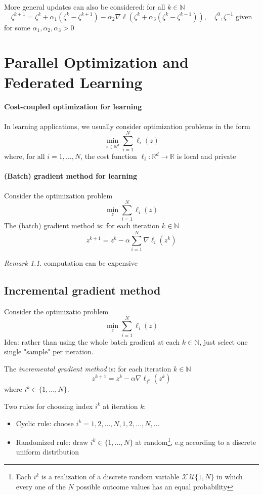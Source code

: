 \documentclass{book}
\newcommand{\R}{\mathbb{R}}
\newcommand{\N}{\mathbb{N}}
\theoremstyle{theoremv2}
\theoremstyle{defv2}
\theoremstyle{remark}
\newtheorem*{remark}{Remark}
\theoremstyle{remark}
\theoremstyle{definition}
\theoremstyle{definition}
\begin{document}
More general updates can also be considered: for all $k\in\N$
\[
    \zeta^{k+1} = \zeta^k + \alpha_1(\zeta^k-\zeta^{k+1})-\alpha_2\nabla\ell\left(\zeta^k+\alpha_3(\zeta^k-\zeta^{k-1})\right), \quad \zeta^0,\zeta^{-1} \text{ given}
\]
for some $\alpha_1, \alpha_2, \alpha_3>0$

\chapter{Parallel Optimization and Federated Learning}
\subsubsection{Cost-coupled optimization for learning}
In learning applications, we usually consider optimization problems in the form 
\[
    \min_{z\in\R^d}\displaystyle\sum_{i=1}^{N}\ell_i(z)
\]
where, for all $i=1,\dots,N$, the cost function $\ell_i:\R^d\to \R$ is local and private 
\subsubsection{(Batch) gradient method for learning}
Consider the optimization problem 
\[
    \min_z \displaystyle\sum_{i=1}^{N}\ell_i(z)
\]
The (batch) gradient method is: for each iteration $k\in\N$ 
\[
    z^{k+1} = z^k -\alpha \displaystyle\sum_{i=1}^{N}\nabla\ell_i(z^k)
\]
\begin{remark}
    computation can be expensive
\end{remark}
\section{Incremental gradient method}
Consider the optimizatio problem
\[
    \min_z \displaystyle\sum_{i=1}^{N}\ell_i(z)
\]
Idea: rather than using the whole batch gradient at each $k\in\N$, just select one single "sample" per iteration. 

The \emph{incremental gradient method} is: for each iteration $k\in\N$
\[
    z^{k+1} = z^k - \alpha\nabla\ell_{i^k}(z^k)
\]
where $i^k\in\{1,\dots,N\}$. 

Two rules for choosing index $i^k$ at iteration $k$: 
\begin{itemize}
    \item Cyclic rule: choose $i^k = 1,2,\dots,N,1,2,\dots,N,\dots$
    \item Randomized rule: draw $i^k\in\{ 1,\dots,N \}$ at random\footnote{Each $i^k$ is a realization of a discrete random variable $\mathcal{X}~\mathcal{U}\{1,N\}$ in which every one of the $N$ possible outcome values has an equal probability}, e.g according to a discrete uniform distribution
\end{itemize}
\end{document}
